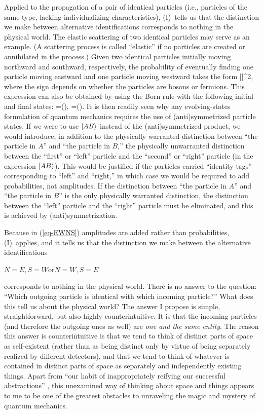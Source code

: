 Applied to the propagation of a pair of identical particles (i.e., particles of the same type, lacking individualizing characteristics), (I)~tells us that the distinction we make between alternative identifications corresponds to nothing in the physical world. The elastic scattering of two identical particles may serve as an example. (A scattering process is called ``elastic'' if no particles are created or annihilated in the process.) Given two identical particles initially moving northward and southward, respectively, the probability of eventually finding one particle moving eastward and one particle moving westward takes the form
\be
\bigl|\pm{}\bigr|^2,\label{eq-EWNS}
\ee
where the sign depends on whether the particles are bosons or fermions. This expression can also be obtained by using the Born rule with the following initial and final states:
\be
{}=\bigl(\pm{}\bigr),\quad
{}=\bigl(\pm{}\bigr).
\ee
It is then readily seen why any evolving-states formulation of quantum mechanics requires the use of (anti)symmetrized particle states. If we were to use $|AB\rangle$ instead of the (anti)symmetrized product, we would introduce, in addition to the physically warranted distinction between ``the particle in $A$'' and ``the particle in $B$,'' the physically unwarranted distinction between the ``first'' or ``left'' particle and the ``second'' or ``right'' particle (in the expression $|AB\rangle$). This would be justified if the particles carried ``identity tags'' corresponding to ``left'' and ``right,'' in which case we would be required to add probabilities, not amplitudes. If the distinction between ``the particle in $A$'' and ``the particle in $B$'' is the only physically warranted distinction, the distinction between the  ``left'' particle and the ``right'' particle must be eliminated, and this is achieved by (anti)symmetrization.

Because in (\ref{eq-EWNS}) amplitudes are added rather than probabilities,  (I)~applies, and it tells us that the distinction we make between the alternative identifications

\medskip\centerline{$N=E,S=W$\quad or\quad $N=W,S=E$}

\medskip\noindent corresponds to nothing in the physical world. There is no answer to the question: ``Which outgoing particle is identical with which incoming particle?'' What does this tell us about the physical world? The answer I propose is simple, straightforward, but also highly counterintuitive. It is that the incoming particles (and therefore the outgoing ones as well) are \emph{one and the same entity}. The reason this answer is counterintuitive is that we tend to think of distinct parts of space as self-existent (rather than as being distinct only by virtue of being separately realized by different detectors), and that we tend to think of whatever is contained in distinct parts of space as separately and independently existing things. Apart from ``our habit of inappropriately reifying our successful abstractions'' \citep{Mermin2009}, this unexamined way of thinking about space and things appears to me to be one of the greatest obstacles to unraveling the magic and mystery of quantum mechanics.

